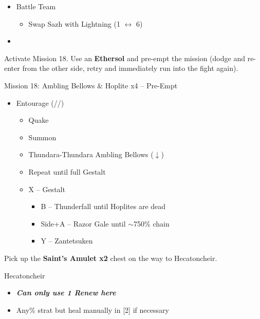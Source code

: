 \begin{menu}
	\begin{itemize}
		\paradigm
		\begin{itemize}
			\item Battle Team
				\begin{itemize}
					\item Swap Sazh with Lightning (1 $\leftrightarrow$ 6)
				\end{itemize}
			\item {}%
				  {\paradigmline[4]{(\rav)}{\med}{\sen}}%
			      {\paradigmline{\rav}{\rav}{\com}}%
			      {\paradigmline{\med}{\med}{\sen}}%
		\end{itemize}
	\end{itemize}
\end{menu}

\renewcommand{\first}{[1] Entourage (\rav/\med/\sen)}

Activate Mission 18.
Use an \textbf{Ethersol} and pre-empt the mission (dodge and re-enter from the other side, retry and immediately run into the fight again).
\vfill
\begin{battle}{Mission 18: Ambling Bellows \& Hoplite x4 -- Pre-Empt}
	\begin{itemize}
		\item \first
			\begin{itemize}
				\item Quake
				\item Summon
				\item Thundara-Thundara Ambling Bellows ($\downarrow$)
				\item Repeat until full Gestalt
				\item X -- Gestalt
					\begin{itemize}
						\item B -- Thunderfall until Hoplites are dead
						\item Side+A -- Razor Gale until $\sim$750\% chain
						\item Y -- Zantetsuken
					\end{itemize}
			\end{itemize}
	\end{itemize}
\end{battle}

Pick up the \textbf{Saint's Amulet x2} chest on the way to Hecatoncheir.

\begin{battle}{Hecatoncheir}
	\begin{itemize}
		\item \textit{\textbf{Can only use 1 Renew here}}
		\item Any\% strat but heal manually in [2] if necessary
	\end{itemize}
\end{battle}


